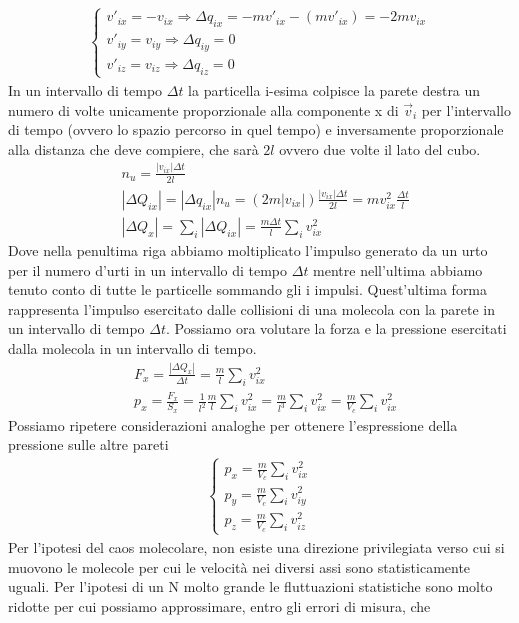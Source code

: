 \documentclass[
10pt, %
a4paper, %
oneside, %
headinclude,footinclude, %
BCOR5mm, %
]{scrartcl}
\begin{document}
\begin{align*} 
	\begin{cases}
		v'_{ix}=-v_{ix} \Rightarrow \Delta q_{ix} = -mv'_{ix}-(mv'_{ix})=-2mv_{ix}\\
		v'_{iy}=v_{iy} \Rightarrow \Delta q_{iy} = 0\\
		v'_{iz}=v_{iz} \Rightarrow \Delta q_{iz} = 0
	\end{cases}
\end{align*} 
In un intervallo di tempo $\Delta t$ la particella i-esima colpisce la parete destra un numero di volte unicamente proporzionale alla componente x di $\vec{v}_i$ per l'intervallo di tempo (ovvero lo spazio percorso in quel tempo) e inversamente proporzionale alla distanza che deve compiere, che sarà $2l$ ovvero due volte il lato del cubo. 
\begin{align*} 
	&n_u = \frac{|v_{ix}| \Delta t}{2l}\\
	&|\Delta Q_{ix}|= |\Delta q_{ix}| n_u = (2m|v_{ix}|) \frac{|v_{ix}| \Delta t}{2l} = m v_{ix}^2 \frac{\Delta t}{l}\\
	&|\Delta Q_{x}| = \sum_i |\Delta Q_{ix}|= \frac{m \Delta t}{l} \sum_i v_{ix}^2 
\end{align*} 
Dove nella penultima riga abbiamo moltiplicato l'impulso generato da un urto per il numero d'urti in un intervallo di tempo $\Delta t$ mentre nell'ultima abbiamo tenuto conto di tutte le particelle sommando gli i impulsi. Quest'ultima forma rappresenta l'impulso esercitato dalle collisioni di una molecola con la parete in un intervallo di tempo $\Delta t$.
Possiamo ora volutare la forza e la pressione esercitati dalla molecola in un intervallo di tempo. 
\begin{align*} 
	&F_x = \frac{|\Delta Q_{x}|}{\Delta t} =  \frac{m}{l} \sum_i v_{ix}^2\\
	&p_x = \frac{F_{x}}{S_x} =  \frac{1}{l^2}\frac{m}{l} \sum_i v_{ix}^2=\frac{m}{l^3} \sum_i v_{ix}^2 = \frac{m}{V_c} \sum_i v_{ix}^2
\end{align*} 
Possiamo ripetere considerazioni analoghe per ottenere l'espressione della pressione sulle altre pareti
\begin{align*} 
	\begin{cases}
		p_x = \frac{m}{V_c} \sum_i v_{ix}^2\\
		p_y = \frac{m}{V_c} \sum_i v_{iy}^2\\
		p_z = \frac{m}{V_c} \sum_i v_{iz}^2
	\end{cases}
\end{align*} 
Per l'ipotesi del caos molecolare, non esiste una direzione privilegiata verso cui si muovono le molecole per cui le velocità nei diversi assi sono statisticamente uguali. Per l'ipotesi di un N molto grande le fluttuazioni statistiche sono molto ridotte per cui possiamo approssimare, entro gli errori di misura, che 
\end{document}
